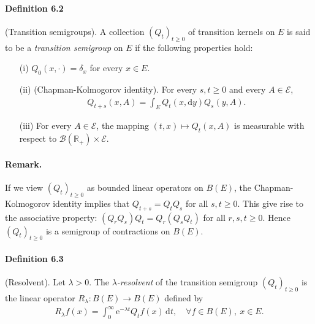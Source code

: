 \documentclass{article}
\numberwithin{equation}{section}
\newcommand{\e}{\mathrm{e}}
\renewcommand{\d}{\mathrm{d}}
\theoremstyle{plain}
\theoremstyle{definition}
\begin{document}
\paragraph{Definition 6.2} (Transition semigroups). A collection $(Q_t)_{t\geq 0}$ of transition kernels on $E$ is said to be a \textit{transition semigroup} on $E$ if the following properties hold:
\begin{itemize}
	\item[(i)] $Q_0(x,\cdot)=\delta_x$ for every $x\in E$.
	\item[(ii)] (Chapman-Kolmogorov identity). For every $s,t\geq 0$ and every $A\in\mathscr{E}$,
	\begin{align*}
		Q_{t+s}(x,A)=\int_E Q_t(x,\d y)Q_s(y,A).
	\end{align*}
    \item[(iii)] For every $A\in\mathscr{E}$, the mapping $(t,x)\mapsto Q_t(x,A)$ is measurable with respect to $\mathscr{B}(\mathbb{R}_+)\times\mathscr{E}$.
\end{itemize}
\paragraph{Remark.} If we view $(Q_t)_{t\geq 0}$ as bounded linear operators on $B(E)$, the Chapman-Kolmogorov identity implies that $Q_{t+s}=Q_tQ_s$ for all $s,t\geq 0$. This give rise to the associative property: $(Q_rQ_s)Q_t=Q_r(Q_sQ_t)$ for all $r,s,t\geq 0$. Hence $(Q_t)_{t\geq 0}$ is a semigroup of contractions on $B(E)$.

\paragraph{Definition 6.3\label{def:6.3}} (Resolvent). Let $\lambda>0$. The \textit{$\lambda$-resolvent} of the transition semigroup $(Q_t)_{t\geq 0}$ is the linear operator $R_\lambda:B(E)\to B(E)$ defined by
\begin{align*}
	R_\lambda f(x) = \int_0^\infty\e^{-\lambda t}Q_tf(x)\,\d t,\quad \forall f\in B(E),\ x\in E.
\end{align*}
\end{document}
